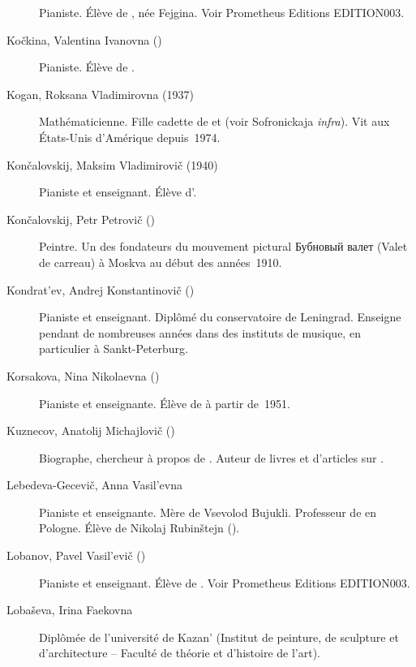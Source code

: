 \begin{description}
 Pianiste.
 Élève de \VSofronitsky{}, née Fejgina.
 Voir Prometheus Editions EDITION003.
 \item[Kočkina, Valentina Ivanovna (\Dates{1923}{2005})]%
 Pianiste.
 Élève de \VSofronitsky{}.
 \item[Kogan, Roksana Vladimirovna (1937\dvsborn{})]%
 Mathématicienne.
 Fille cadette de \VSofronitsky{} et \EScriabina{} (voir Sofronickaja
 \emph{infra}).
 Vit aux États-Unis d'\hbox{Amérique} depuis~1974.
 \item[Končalovskij, Maksim Vladimirovič (1940\dvsborn{})]%
 Pianiste et enseignant.
 Élève d'\EGuilels{}.
 \item[Končalovskij, Petr Petrovič (\Dates{1876}{1956})]%
 Peintre.
 Un des fondateurs du mouvement pictural \foreignlanguage{russian}{Бубновый
 валет} (Valet de carreau) à Moskva au début des années~1910.
 \item[Kondrat'ev, Andrej Konstantinovič (\Dates{1927}{2001})]%
 Pianiste et enseignant.
 Diplômé du conservatoire de Leningrad.
 Enseigne pendant de nombreuses années dans des instituts de musique, en
 particulier à Sankt-Peterburg.
 \item[Korsakova, Nina Nikolaevna (\Dates{1924}{2007})]%
 Pianiste et enseignante.
 Élève de \VSofronitsky{} à partir de~1951.
 \item[Kuznecov, Anatolij Michajlovič (\Dates{1935}{2010})]%
 Biographe, chercheur à propos de \MYudina{}.
 Auteur de livres et d'articles sur \MYudina{}.
 \item[Lebedeva-Gecevič, Anna Vasil'evna]%
 Pianiste et enseignante.
 Mère de Vsevolod Bujukli.
 Professeur de \VSofronitsky{} en Pologne.
 Élève de Nikolaj Rubinštejn ().
 \item[Lobanov, Pavel Vasil'evič (\Dates{1923}{2016})]%
 Pianiste et enseignant.
 Élève de \VSofronitsky{}.
 Voir Prometheus Editions EDITION003.
 \item[Lobaševa, Irina Faekovna]%
 Diplômée de l'université de Kazan' (Institut de peinture, de sculpture et
 d'architecture -- Faculté de théorie et d'histoire de l'art).

\end{description}
